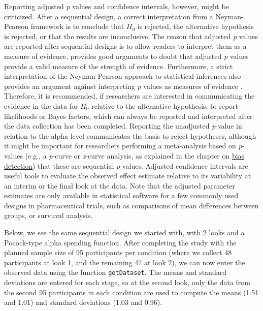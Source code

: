 \documentclass[
  oneside]{krantz}
\begin{document}
Reporting adjusted \emph{p} values and confidence intervals, however, might be criticized. After a sequential design, a correct interpretation from a Neyman-Pearson framework is to conclude that \(H_0\) is rejected, the alternative hypothesis is rejected, or that the results are inconclusive. The reason that adjusted \emph{p} values are reported after sequential designs is to allow readers to interpret them as a measure of evidence. \citet{dupont_sequential_1983} provides good arguments to doubt that adjusted \emph{p} values provide a valid measure of the strength of evidence. Furthermore, a strict interpretation of the Neyman-Pearson approach to statistical inferences also provides an argument against interpreting \emph{p} values as measures of evidence \citep{lakens_why_2022}. Therefore, it is recommended, if researchers are interested in communicating the evidence in the data for \(H_0\) relative to the alternative hypothesis, to report likelihoods or Bayes factors, which can always be reported and interpreted after the data collection has been completed. Reporting the unadjusted \emph{p}-value in relation to the alpha level communicates the basis to reject hypotheses, although it might be important for researchers performing a meta-analysis based on \emph{p}-values (e.g., a \emph{p}-curve or \emph{z}-curve analysis, as explained in the chapter on \protect\hyperlink{bias}{bias detection}) that these are sequential \emph{p}-values. Adjusted confidence intervals are useful tools to evaluate the observed effect estimate relative to its variability at an interim or the final look at the data. Note that the adjusted parameter estimates are only available in statistical software for a few commonly used designs in pharmaceutical trials, such as comparisons of mean differences between groups, or survuval analysis.

Below, we see the same sequential design we started with, with 2 looks and a Pocock-type alpha spending function. After completing the study with the planned sample size of 95 participants per condition (where we collect 48 participants at look 1, and the remaining 47 at look 2), we can now enter the observed data using the function \texttt{getDataset}. The means and standard deviations are entered for each stage, so at the second look, only the data from the second 95 participants in each condition are used to compute the means (1.51 and 1.01) and standard deviations (1.03 and 0.96).
\end{document}
